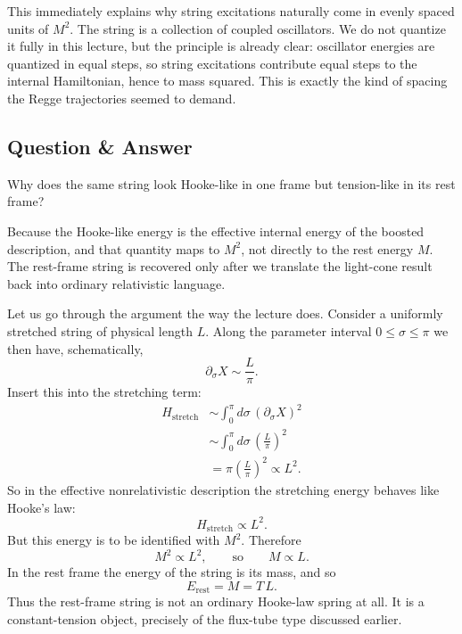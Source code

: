 This immediately explains why string excitations naturally come in evenly spaced units of \(M^2\). The string is a collection of coupled oscillators. We do not quantize it fully in this lecture, but the principle is already clear: oscillator energies are quantized in equal steps, so string excitations contribute equal steps to the internal Hamiltonian, hence to mass squared. This is exactly the kind of spacing the Regge trajectories seemed to demand.

\subsection{Question \& Answer}

Why does the same string look Hooke-like in one frame but tension-like in its rest frame?

Because the Hooke-like energy is the effective internal energy of the boosted description, and that quantity maps to \(M^2\), not directly to the rest energy \(M\). The rest-frame string is recovered only after we translate the light-cone result back into ordinary relativistic language.

Let us go through the argument the way the lecture does. Consider a uniformly stretched string of physical length \(L\). Along the parameter interval \(0\leq \sigma\leq \pi\) we then have, schematically,
\begin{equation}
\partial_\sigma X \sim \frac{L}{\pi}.
\end{equation}
Insert this into the stretching term:
\begin{align}
H_{\mathrm{stretch}}
&\sim
\int_0^\pi d\sigma\,\left(\partial_\sigma X\right)^2
\\
&\sim
\int_0^\pi d\sigma\,\left(\frac{L}{\pi}\right)^2
\\
&=
\pi\left(\frac{L}{\pi}\right)^2
\propto L^2.
\end{align}
So in the effective nonrelativistic description the stretching energy behaves like Hooke's law:
\begin{equation}
H_{\mathrm{stretch}} \propto L^2.
\end{equation}
But this energy is to be identified with \(M^2\). Therefore
\begin{equation}
M^2\propto L^2,
\qquad \text{so} \qquad
M\propto L.
\end{equation}
In the rest frame the energy of the string is its mass, and so
\begin{equation}
E_{\text{rest}}=M=T\,L.
\end{equation}
Thus the rest-frame string is not an ordinary Hooke-law spring at all. It is a constant-tension object, precisely of the flux-tube type discussed earlier.

